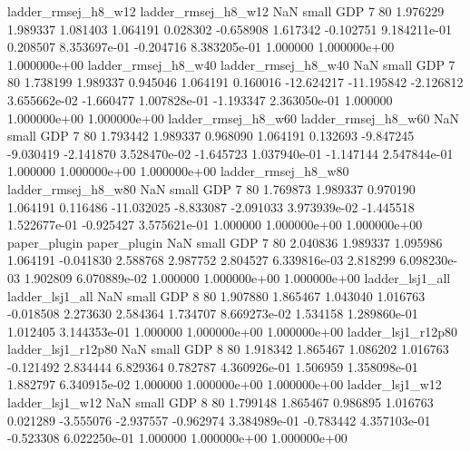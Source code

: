      ladder_rmsej_h8_w12      ladder_rmsej_h8_w12                   NaN      small      GDP                 7 80 1.976229       1.989337 1.081403       1.064191    0.028302     -0.658908      1.617342    -0.102751   9.184211e-01  0.208507 8.353697e-01    -0.204716   8.383205e-01            1.000000    1.000000e+00        1.000000e+00
     ladder_rmsej_h8_w40      ladder_rmsej_h8_w40                   NaN      small      GDP                 7 80 1.738199       1.989337 0.945046       1.064191    0.160016    -12.624217    -11.195842    -2.126812   3.655662e-02 -1.660477 1.007828e-01    -1.193347   2.363050e-01            1.000000    1.000000e+00        1.000000e+00
     ladder_rmsej_h8_w60      ladder_rmsej_h8_w60                   NaN      small      GDP                 7 80 1.793442       1.989337 0.968090       1.064191    0.132693     -9.847245     -9.030419    -2.141870   3.528470e-02 -1.645723 1.037940e-01    -1.147144   2.547844e-01            1.000000    1.000000e+00        1.000000e+00
     ladder_rmsej_h8_w80      ladder_rmsej_h8_w80                   NaN      small      GDP                 7 80 1.769873       1.989337 0.970190       1.064191    0.116486    -11.032025     -8.833087    -2.091033   3.973939e-02 -1.445518 1.522677e-01    -0.925427   3.575621e-01            1.000000    1.000000e+00        1.000000e+00
            paper_plugin             paper_plugin                   NaN      small      GDP                 7 80 2.040836       1.989337 1.095986       1.064191   -0.041830      2.588768      2.987752     2.804527   6.339816e-03  2.818299 6.098230e-03     1.902809   6.070889e-02            1.000000    1.000000e+00        1.000000e+00
         ladder_lsj1_all          ladder_lsj1_all                   NaN      small      GDP                 8 80 1.907880       1.865467 1.043040       1.016763   -0.018508      2.273630      2.584364     1.734707   8.669273e-02  1.534158 1.289860e-01     1.012405   3.144353e-01            1.000000    1.000000e+00        1.000000e+00
      ladder_lsj1_r12p80       ladder_lsj1_r12p80                   NaN      small      GDP                 8 80 1.918342       1.865467 1.086202       1.016763   -0.121492      2.834444      6.829364     0.782787   4.360926e-01  1.506959 1.358098e-01     1.882797   6.340915e-02            1.000000    1.000000e+00        1.000000e+00
         ladder_lsj1_w12          ladder_lsj1_w12                   NaN      small      GDP                 8 80 1.799148       1.865467 0.986895       1.016763    0.021289     -3.555076     -2.937557    -0.962974   3.384989e-01 -0.783442 4.357103e-01    -0.523308   6.022250e-01            1.000000    1.000000e+00        1.000000e+00
